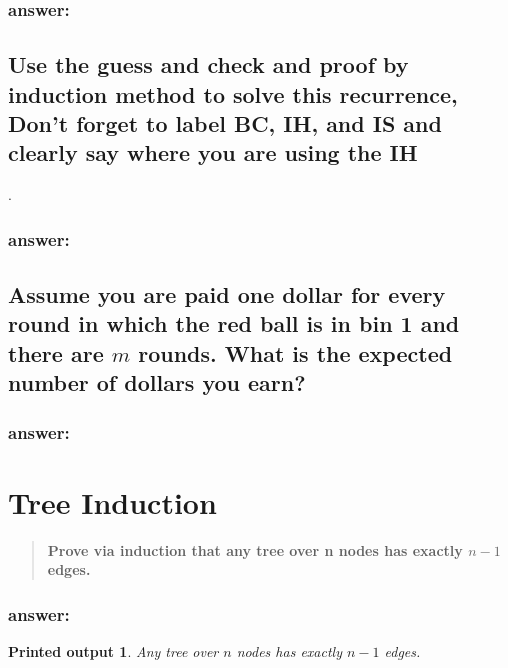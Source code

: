 \documentclass[titlepage]{article}\usepackage[]{graphicx}\usepackage[]{color}
\newtheorem{name}{Printed output}
\begin{document}
\subsubsection{answer:}
\vspace{8cm}


\subsection{Use the guess and check and proof by induction method to solve this
	recurrence, Don't forget to label BC, IH, and IS and clearly say where you
	are using the IH}.
\subsubsection{answer:}
\vspace{8cm}


\subsection{Assume you are paid one dollar for every round in which the red
	ball is in bin 1 and there are $m$ rounds. What is the expected number of
dollars you earn?}
\subsubsection{answer:}
\vspace{8cm}


\section{Tree Induction}
\begin{quote}
  \textbf{Prove via induction that any tree over n nodes has exactly $n-1$
  edges. }
\end{quote}

\subsubsection{answer:}

\newtheorem{mydef}{Theorem}

\begin{name}
  Any tree over $n$ nodes has exactly $n-1$ edges.
\end{name}
\end{document}
